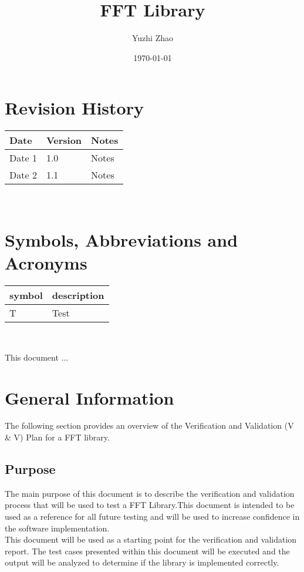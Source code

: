\documentclass[12pt, titlepage]{article}
\begin{document}
\title{FFT Library} 
\author{Yuzhi Zhao}
\date{\today}
	
\maketitle


\section{Revision History}

\begin{tabularx}{\textwidth}{p{3cm}p{2cm}X}
\toprule {\bf Date} & {\bf Version} & {\bf Notes}\\
\midrule
Date 1 & 1.0 & Notes\\
Date 2 & 1.1 & Notes\\
\bottomrule
\end{tabularx}

~\newpage

\section{Symbols, Abbreviations and Acronyms}

\renewcommand{\arraystretch}{1.2}
\begin{tabular}{l l} 
  \toprule		
  \textbf{symbol} & \textbf{description}\\
  \midrule 
  T & Test\\
  \bottomrule
\end{tabular}\\


\newpage

\tableofcontents

\listoftables

\listoffigures

\newpage


This document ...

\section{General Information}
The following section provides an overview of the Verification and Validation (V \& V) Plan for a FFT library.

\subsection{Purpose}
The main purpose of this document is to describe the verification and validation process
that will be used to test a FFT Library.This document is intended to be used as a reference for all future testing and will be used
to increase confidence in the software implementation.\\
This document will be used as a starting point for the verification and validation report.
The test cases presented within this document will be executed and the output will be
analyzed to determine if the library is implemented correctly.
\end{document}
